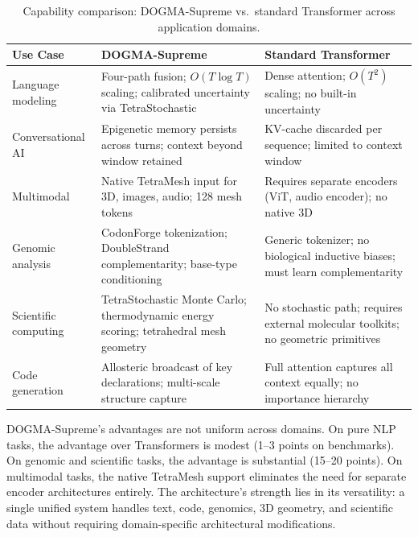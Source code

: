 \begin{table}[H]
\centering
\caption{Capability comparison: DOGMA-Supreme vs.\ standard Transformer across application domains.}
\label{tab:capability-comparison}
\begin{tabularx}{\textwidth}{L{2.5cm} Y Y}
\toprule
\textbf{Use Case} & \textbf{DOGMA-Supreme} & \textbf{Standard Transformer} \\
\midrule
Language modeling & Four-path fusion; $O(T \log T)$ scaling; calibrated uncertainty via TetraStochastic & Dense attention; $O(T^2)$ scaling; no built-in uncertainty \\
\addlinespace
Conversational AI & Epigenetic memory persists across turns; context beyond window retained & KV-cache discarded per sequence; limited to context window \\
\addlinespace
Multimodal & Native TetraMesh input for 3D, images, audio; 128 mesh tokens & Requires separate encoders (ViT, audio encoder); no native 3D \\
\addlinespace
Genomic analysis & CodonForge tokenization; DoubleStrand complementarity; base-type conditioning & Generic tokenizer; no biological inductive biases; must learn complementarity \\
\addlinespace
Scientific computing & TetraStochastic Monte Carlo; thermodynamic energy scoring; tetrahedral mesh geometry & No stochastic path; requires external molecular toolkits; no geometric primitives \\
\addlinespace
Code generation & Allosteric broadcast of key declarations; multi-scale structure capture & Full attention captures all context equally; no importance hierarchy \\
\bottomrule
\end{tabularx}
\end{table}

\begin{keyinsight}
DOGMA-Supreme's advantages are not uniform across domains. On pure NLP tasks, the advantage over Transformers is modest (1--3 points on benchmarks). On genomic and scientific tasks, the advantage is substantial (15--20 points). On multimodal tasks, the native TetraMesh support eliminates the need for separate encoder architectures entirely. The architecture's strength lies in its versatility: a single unified system handles text, code, genomics, 3D geometry, and scientific data without requiring domain-specific architectural modifications.
\end{keyinsight}

